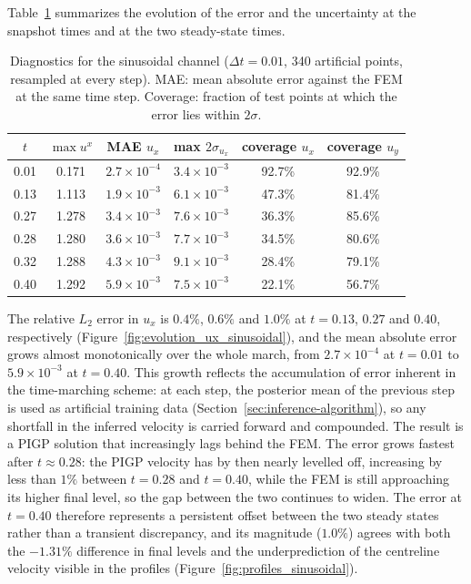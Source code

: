 \documentclass[11pt, a4paper]{report}
\begin{document}
Table~\ref{tab:sinusoidal-diagnostics} summarizes the evolution of the error and the
uncertainty at the snapshot times and at the two steady-state times.

\begin{table}[H]
\centering
\caption{Diagnostics for the sinusoidal channel (\(\Delta t = 0.01\), 340 artificial
points, resampled at every step). MAE: mean absolute error against the FEM at the same
time step. Coverage: fraction of test points at which the error lies within
\(2\sigma\).}%
\label{tab:sinusoidal-diagnostics}
\begin{tabular}{cccccc}
\toprule
\(t\) & \(\max u^x\) & MAE \(u_x\) & max \(2\sigma_{u_x}\) & coverage \(u_x\) & coverage \(u_y\) \\
\midrule
0.01 & 0.171 & \(2.7\times10^{-4}\) & \(3.4\times10^{-3}\) & 92.7\% & 92.9\% \\
0.13 & 1.113 & \(1.9\times10^{-3}\) & \(6.1\times10^{-3}\) & 47.3\% & 81.4\% \\
0.27 & 1.278 & \(3.4\times10^{-3}\) & \(7.6\times10^{-3}\) & 36.3\% & 85.6\% \\
0.28 & 1.280 & \(3.6\times10^{-3}\) & \(7.7\times10^{-3}\) & 34.5\% & 80.6\% \\
0.32 & 1.288 & \(4.3\times10^{-3}\) & \(9.1\times10^{-3}\) & 28.4\% & 79.1\% \\
0.40 & 1.292 & \(5.9\times10^{-3}\) & \(7.5\times10^{-3}\) & 22.1\% & 56.7\% \\
\bottomrule
\end{tabular}
\end{table}

The relative \(L_2\) error in \(u_x\) is \(0.4\%\), \(0.6\%\) and \(1.0\%\) at
\(t=0.13\), \(0.27\) and \(0.40\), respectively
(Figure~\ref{fig:evolution_ux_sinusoidal}), and the mean absolute error grows almost
monotonically over the whole march, from \(2.7\times10^{-4}\) at \(t=0.01\) to
\(5.9\times10^{-3}\) at \(t=0.40\). This growth reflects the accumulation of error
inherent in the time-marching scheme: at each step, the posterior mean of the previous
step is used as artificial training data (Section~\ref{sec:inference-algorithm}), so
any shortfall in the inferred velocity is carried forward and compounded. The result
is a PIGP solution that increasingly lags behind the FEM. The error grows fastest
after \(t \approx 0.28\): the PIGP velocity has by then nearly levelled off, increasing
by less than \(1\%\) between \(t=0.28\) and \(t=0.40\), while the FEM is still
approaching its higher final level, so the gap between the two continues to widen.
The error at \(t=0.40\) therefore represents a persistent offset between the two
steady states rather than a transient discrepancy, and its magnitude (\(1.0\%\))
agrees with both the \(-1.31\%\) difference in final levels and the underprediction
of the centreline velocity visible in the profiles
(Figure~\ref{fig:profiles_sinusoidal}).
\end{document}
